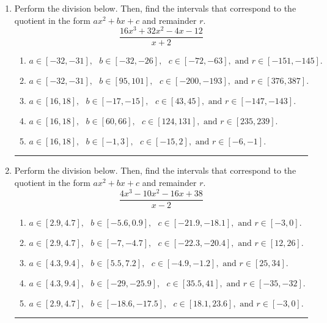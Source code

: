 \documentclass[14pt]{extbook}
\newcommand{\litem}[1]{\item#1\hspace*{-1cm}\rule{\textwidth}{0.4pt}}
\begin{document}
\begin{enumerate}
{\begin{enumerate}[label=\Alph*.]
\end{enumerate} }
\litem{
Perform the division below. Then, find the intervals that correspond to the quotient in the form $ax^2+bx+c$ and remainder $r$.\[ \frac{16x^{3} +32 x^{2} -4 x -12}{x + 2} \]\begin{enumerate}[label=\Alph*.]
\item \( a \in [-32, -31], \text{   } b \in [-32, -26], \text{   } c \in [-72, -63], \text{   and   } r \in [-151, -145]. \)
\item \( a \in [-32, -31], \text{   } b \in [95, 101], \text{   } c \in [-200, -193], \text{   and   } r \in [376, 387]. \)
\item \( a \in [16, 18], \text{   } b \in [-17, -15], \text{   } c \in [43, 45], \text{   and   } r \in [-147, -143]. \)
\item \( a \in [16, 18], \text{   } b \in [60, 66], \text{   } c \in [124, 131], \text{   and   } r \in [235, 239]. \)
\item \( a \in [16, 18], \text{   } b \in [-1, 3], \text{   } c \in [-15, 2], \text{   and   } r \in [-6, -1]. \)

\end{enumerate} }
\litem{
Perform the division below. Then, find the intervals that correspond to the quotient in the form $ax^2+bx+c$ and remainder $r$.\[ \frac{4x^{3} -10 x^{2} -16 x + 38}{x -2} \]\begin{enumerate}[label=\Alph*.]
\item \( a \in [2.9, 4.7], \text{   } b \in [-5.6, 0.9], \text{   } c \in [-21.9, -18.1], \text{   and   } r \in [-3, 0]. \)
\item \( a \in [2.9, 4.7], \text{   } b \in [-7, -4.7], \text{   } c \in [-22.3, -20.4], \text{   and   } r \in [12, 26]. \)
\item \( a \in [4.3, 9.4], \text{   } b \in [5.5, 7.2], \text{   } c \in [-4.9, -1.2], \text{   and   } r \in [25, 34]. \)
\item \( a \in [4.3, 9.4], \text{   } b \in [-29, -25.9], \text{   } c \in [35.5, 41], \text{   and   } r \in [-35, -32]. \)
\item \( a \in [2.9, 4.7], \text{   } b \in [-18.6, -17.5], \text{   } c \in [18.1, 23.6], \text{   and   } r \in [-3, 0]. \)


\end{enumerate}}
\end{enumerate}
\end{document}
